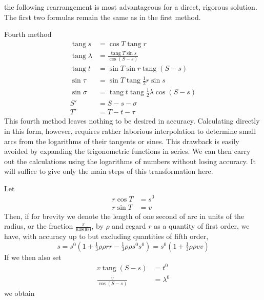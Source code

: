 %
the following rearrangement is most advantageous for a direct, rigorous solution. The first two formulas remain the same as in the first method.

Fourth method
\[
\begin{aligned}
\operatorname{tang}s&=\cos T\operatorname{tang}r\\
\operatorname{tang}\lambda&=\frac{\operatorname{tang}T\sin s}{\cos(S-s)}\\
\operatorname{tang}t&=\sin T\sin r\operatorname{tang}(S-s)\\
\sin\tau&=\sin T\operatorname{tang}\tfrac{1}{2}r\sin s\\
\sin\sigma&=\operatorname{tang}t\operatorname{tang}\tfrac{1}{2}\lambda\cos(S-s)\\
S'&=S-s-\sigma\\
T'&=T-t-\tau
\end{aligned}
\]
\indent This fourth method leaves nothing to be desired in accuracy. Calculating directly in this form, however, requires rather laborious interpolation to determine small arcs from the logarithms of their tangents or sines. This drawback is easily avoided by expanding the trigonometric functions in series. We can then carry out the calculations using the logarithms of numbers without losing accuracy. It will suffice to give only the main steps of this transformation here.

Let
\[
\begin{aligned}
r\cos T&=s^0\\
r\sin T&=v
\end{aligned}
\]
Then, if for brevity we denote the length of one second of arc in units of the radius, or the fraction \(\tfrac{\pi}{648000}\), by \(\rho\) and regard \(r\) as a quantity of first order, we have, with accuracy up to but excluding quantities of fifth order,
\[
s=s^0(1+\tfrac{1}{3}\rho\rho rr-\tfrac{1}{3}\rho\rho s^0s^0)=s^0(1+\tfrac{1}{3}\rho\rho vv)
\]
If we then also set
\[
\begin{aligned}
v\operatorname{tang}(S-s)&=t^0\\
\frac{v}{\cos(S-s)}&=\lambda^0
\end{aligned}
\]
we obtain
